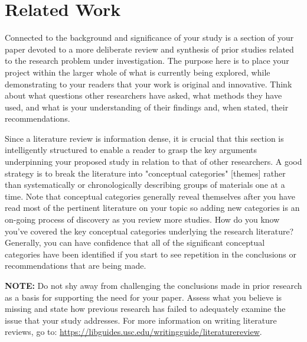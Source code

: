 \documentclass[10pt,twocolumn,letterpaper]{article}
\begin{document}
\section{Related Work}

Connected to the background and significance of your study is a section of your paper devoted to a more deliberate review and synthesis of prior studies related to the research problem under investigation. The purpose here is to place your project within the larger whole of what is currently being explored, while demonstrating to your readers that your work is original and innovative. Think about what questions other researchers have asked, what methods they have used, and what is your understanding of their findings and, when stated, their recommendations.

Since a literature review is information dense, it is crucial that this section is intelligently structured to enable a reader to grasp the key arguments underpinning your proposed study in relation to that of other researchers. A good strategy is to break the literature into "conceptual categories" [themes] rather than systematically or chronologically describing groups of materials one at a time. Note that conceptual categories generally reveal themselves after you have read most of the pertinent literature on your topic so adding new categories is an on-going process of discovery as you review more studies. How do you know you've covered the key conceptual categories underlying the research literature? Generally, you can have confidence that all of the significant conceptual categories have been identified if you start to see repetition in the conclusions or recommendations that are being made.

\textbf{NOTE:} Do not shy away from challenging the conclusions made in prior research as a basis for supporting the need for your paper. Assess what you believe is missing and state how previous research has failed to adequately examine the issue that your study addresses. For more information on writing literature reviews, go to: \url{https://libguides.usc.edu/writingguide/literaturereview}.
\end{document}
